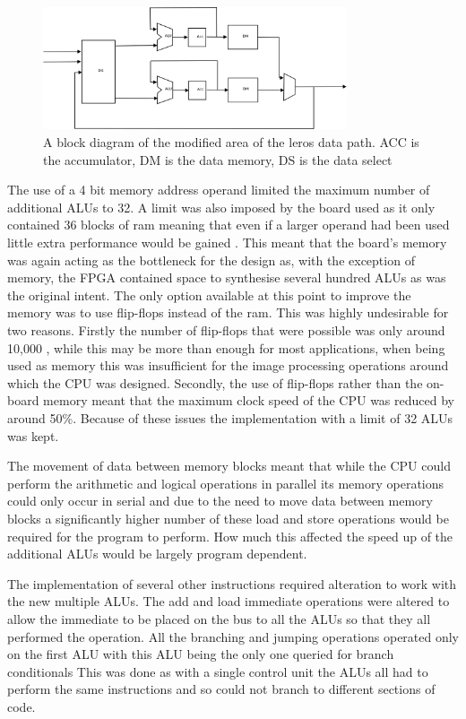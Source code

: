 \begin{figure}[ht]
	\begin{center}
		\includegraphics[width=0.8\textwidth]{images/new_path}
	\end{center}
	\caption{A block diagram of the modified area of the leros data path. ACC is the accumulator, DM is the data memory, DS is the data select}
	\label{new_path}
\end{figure}

The use of a 4 bit memory address operand limited the maximum number of additional ALUs to 32. A limit was also imposed by the board used as it only contained 36 blocks of ram meaning that even if a larger operand had been used little extra performance would be gained \cite{spartan_ram}. This meant that the board's memory was again acting as the bottleneck for the design as, with the exception of memory, the FPGA contained space to synthesise several hundred ALUs as was the original intent. The only option available at this point  to improve the memory was to use flip-flops instead of the ram. This was highly undesirable for two reasons. Firstly the number of flip-flops that were possible was only around 10,000 \cite{spartan_user}, while this may be more than enough for most applications, when being used as memory this was insufficient for the image processing operations around which the CPU was designed. Secondly, the use of flip-flops rather than the on-board memory meant that the maximum clock speed of the CPU was reduced by around 50\%. Because of these issues the implementation with a limit of 32 ALUs was kept.

The movement of data between memory blocks meant that while the CPU could perform the arithmetic and logical operations in parallel its memory operations could only occur in serial and due to the need to move data between memory blocks a significantly higher number of these load and store operations would be required for the program to perform. How much this affected the speed up of the additional ALUs would be largely program dependent. 

The implementation of several other instructions required alteration to work with the new multiple ALUs. The add and load immediate operations were altered to allow the immediate to be placed on the bus to all the ALUs so that they all performed the operation. All the branching and jumping operations operated only on the first ALU with this ALU being the only one  queried for branch conditionals This was done as with a single control unit the ALUs all had to perform the same instructions and so could not branch to different sections of code.
